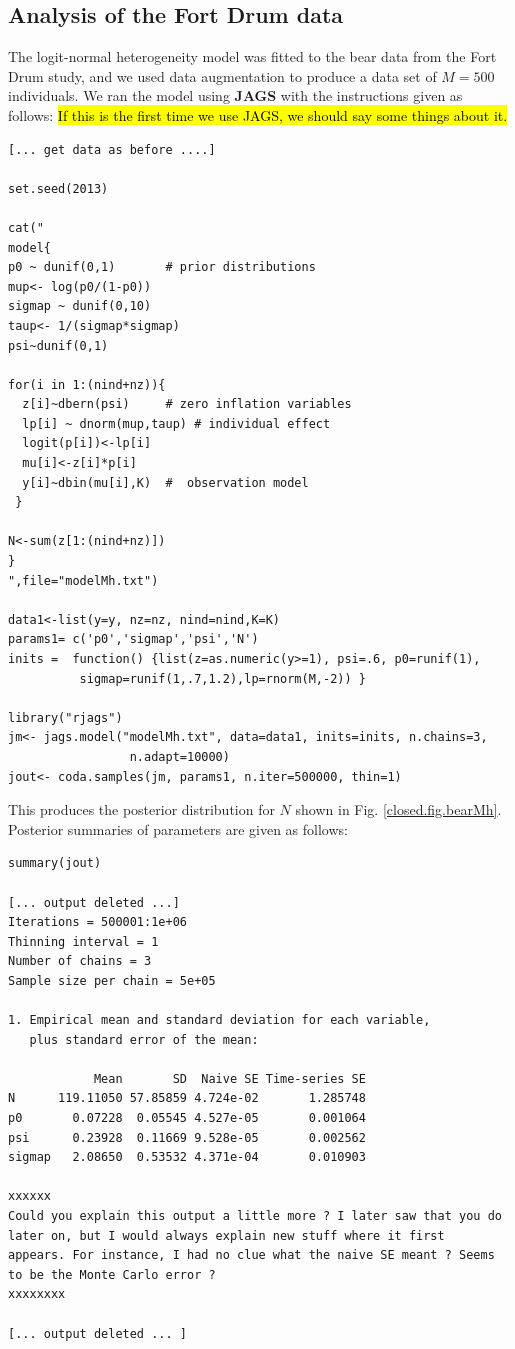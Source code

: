 \subsection{Analysis of the Fort Drum data}
\label{closed.sec.Mhbear}
The logit-normal heterogeneity model was fitted to the bear data from
the Fort Drum study, and we used data augmentation to produce a data
set of $M=500$ individuals.  We ran the model using {\bf JAGS} with
the instructions given as follows:
\hl{If this is the first time we use JAGS, we should say some things
  about it.}
{\small
\begin{verbatim}
[... get data as before ....]

set.seed(2013)

cat("
model{
p0 ~ dunif(0,1)       # prior distributions
mup<- log(p0/(1-p0))
sigmap ~ dunif(0,10)
taup<- 1/(sigmap*sigmap)
psi~dunif(0,1)

for(i in 1:(nind+nz)){
  z[i]~dbern(psi)     # zero inflation variables
  lp[i] ~ dnorm(mup,taup) # individual effect
  logit(p[i])<-lp[i]
  mu[i]<-z[i]*p[i]
  y[i]~dbin(mu[i],K)  #  observation model
 }

N<-sum(z[1:(nind+nz)])
}
",file="modelMh.txt")

data1<-list(y=y, nz=nz, nind=nind,K=K)
params1= c('p0','sigmap','psi','N')
inits =  function() {list(z=as.numeric(y>=1), psi=.6, p0=runif(1),
          sigmap=runif(1,.7,1.2),lp=rnorm(M,-2)) }

library("rjags")
jm<- jags.model("modelMh.txt", data=data1, inits=inits, n.chains=3,
                 n.adapt=10000)
jout<- coda.samples(jm, params1, n.iter=500000, thin=1)
\end{verbatim}
}
This produces the posterior distribution for $N$ shown
in Fig. \ref{closed.fig.bearMh}. Posterior summaries of parameters are
given as follows:
{\small
\begin{verbatim}
summary(jout)

[... output deleted ...]
Iterations = 500001:1e+06
Thinning interval = 1
Number of chains = 3
Sample size per chain = 5e+05

1. Empirical mean and standard deviation for each variable,
   plus standard error of the mean:

            Mean       SD  Naive SE Time-series SE
N      119.11050 57.85859 4.724e-02       1.285748
p0       0.07228  0.05545 4.527e-05       0.001064
psi      0.23928  0.11669 9.528e-05       0.002562
sigmap   2.08650  0.53532 4.371e-04       0.010903

xxxxxx
Could you explain this output a little more ? I later saw that you do
later on, but I would always explain new stuff where it first
appears. For instance, I had no clue what the naive SE meant ? Seems
to be the Monte Carlo error ?
xxxxxxxx

[... output deleted ... ]
\end{verbatim}
}

